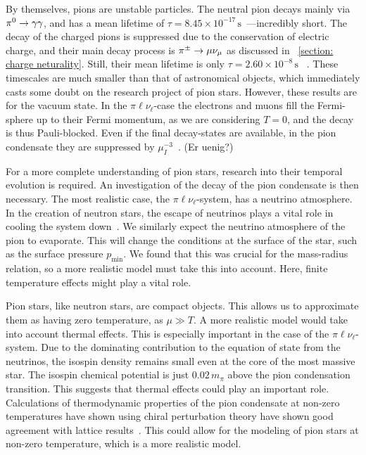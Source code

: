 By themselves, pions are unstable particles.
The neutral pion decays mainly via ${\pi^0}\rightarrow \gamma\gamma$, and has a mean lifetime of $\tau = 8.45\times 10^{-17}\,\text{s}$~\autocite{particledatagroupReviewParticlePhysics2020}---incredibly short.
The decay of the charged pions is suppressed due to the conservation of electric charge, and their main decay process is ${\pi^\pm}\rightarrow \mu \nu_\mu$ as discussed in
%
~\autoref{section: charge neturality}.
%
Still, their mean lifetime is only $\tau = 2.60\times 10^{-8}\,\text{s}$
%
~\autocite{particledatagroupReviewParticlePhysics2020}.
%
These timescales are much smaller than that of astronomical objects, which immediately casts some doubt on the research project of pion stars.
However, these results are for the vacuum state.
In the $\pi\ell\nu_\ell$-case the electrons and muons fill the Fermi-sphere up to their Fermi momentum, as we are considering $T = 0$, and the decay is thus Pauli-blocked.
Even if the final decay-states are available, in the pion condensate they are suppressed by $\mu_I^{-3}$~\autocite{brandtNewClassCompact2018}. 
(Er \autocite{mammarellaIntriguingAspectsMeson2015} uenig?)

For a more complete understanding of pion stars, research into their temporal evolution is required.
An investigation of the decay of the pion condensate is then necessary.
The most realistic case, the $\pi\ell\nu_\ell$-system, has a neutrino atmosphere.
In the creation of neutron stars, the escape of neutrinos plays a vital role in cooling the system down~\autocite{glendenningCompactStarsNuclear2012}.
We similarly expect the neutrino atmosphere of the pion to evaporate.
This will change the conditions at the surface of the star, such as the surface pressure $p_\text{min}$.
We found that this was crucial for the mass-radius relation, so a more realistic model must take this into account.
Here, finite temperature effects might play a vital role.


Pion stars, like neutron stars, are compact objects.
This allows us to approximate them as having zero temperature, as $\mu \gg T$.
A more realistic model would take into account thermal effects.
This is especially important in the case of the $\pi\ell\nu_\ell$-system.
Due to the dominating contribution to the equation of state from the neutrinos, the isospin density remains small even at the core of the most massive star.
The isospin chemical potential is just $0.02\,m_\pi$ above the pion condensation transition.
This suggests that thermal effects could play an important role.
Calculations of thermodynamic properties of the pion condensate at non-zero temperatures have shown using chiral perturbation theory have shown good agreement with lattice results~\autocite{adhikariCondensatesPressureTwoflavor2021}.
This could allow for the modeling of pion stars at non-zero temperature, which is a more realistic model.


